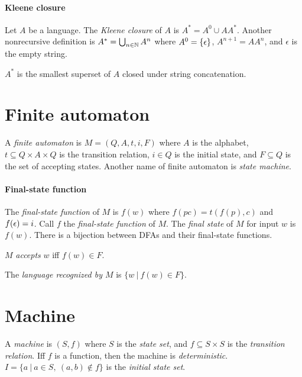 \paragraph{Kleene closure}
Let \(A\) be a language.
The
%
%
%
\emph{Kleene closure}
of \(A\) is \(A^* = A^0 \cup AA^*\).
Another nonrecursive definition is
\( A^* = \bigcup_{n \in \mathbb{N}} A^n \)
where \( A^0 = \{\epsilon\} \),
\( A^{n+1} = A A^n \),
and \(\epsilon\) is the
%
%
empty string.

\(A^*\) is the smallest superset of \(A\)
closed under string concatenation.

\section{Finite automaton}


A
%
\emph{finite automaton} is \(M = (Q,A,t,i,F)\) where
\(A\) is the alphabet,
\(t \subseteq Q \times A \times Q\) is the transition relation,
\(i \in Q\) is the initial state,
and \(F \subseteq Q\) is the set of accepting states.
Another name of finite automaton is
%
\emph{state machine}.

\paragraph{Final-state function}
The \emph{final-state function} of \(M\) is \(f(w)\)
where \(f(pc) = t(f(p), c)\) and \(f(\epsilon)=i\).
Call \(f\) the \emph{final-state function} of \(M\).
The \emph{final state} of \(M\) for input \(w\) is \(f(w)\).
There is a bijection between DFAs and their final-state functions.

\(M\) \emph{accepts} \(w\) iff \(f(w) \in F\).

The \emph{language recognized by \(M\)} is \(\{ w ~|~ f(w) \in F \}\).

\section{Machine}

A \emph{machine} is \((S,f)\)
where \(S\) is the \emph{state set},
and \(f \subseteq S \times S\) is the \emph{transition relation}.
Iff \(f\) is a function, then the machine is \emph{deterministic}.
\(I = \{ a ~|~ a \in S, ~ (a,b) \not\in f \}\) is the \emph{initial state set}.

